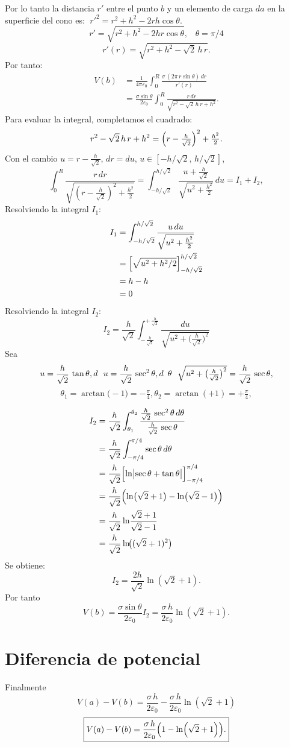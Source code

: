 \documentclass[12pt]{article}
\begin{document}
Por lo tanto la distancia \(r'\) entre el punto \(b\) y un elemento de carga \(da\) en la superficie del cono es:
\(\;r'^2 = r^2 + h^2 - 2rh\cos\theta.\)
\[
  r'=\sqrt{r^2 + h^2 - 2hr\cos\theta} , \,\,\,\,\,\theta = \pi/4
\]
\[
r'(r)=\sqrt{r^2 + h^2 - \sqrt2\,h\,r }.
\]
Por tanto:
\begin{align*}
V(b)
&=\frac{1}{4\pi\varepsilon_0}\int_{0}^{R}\frac{\sigma\,(2\pi\,r\sin\theta)\,dr}{r'(r)}\\
&=\frac{\sigma\sin\theta}{2\varepsilon_0}\int_{0}^{R}\frac{r\,dr}{\sqrt{r^2 - \sqrt2\,h\,r + h^2}}.
\end{align*}
Para evaluar la integral, completamos el cuadrado:
\[
  r^2 - \sqrt2\,h\,r + h^2
  =\Bigl(r-\tfrac{h}{\sqrt2}\Bigr)^2 + \tfrac{h^2}{2}.
\]
Con el cambio $u=r-\tfrac{h}{\sqrt2}$, $dr=du$, $u\in[-h/\sqrt2,\,h/\sqrt2]$,
\[
\int_{0}^{R}\frac{r\,dr}{\sqrt{(r-\tfrac{h}{\sqrt2})^2+\tfrac{h^2}{2}}}
=\int_{-h/\sqrt2}^{h/\sqrt2}\frac{u+\tfrac{h}{\sqrt2}}{\sqrt{u^2+\tfrac{h^2}{2}}}\,du
=I_1+I_2,
\]
Resolviendo la integral \(I_1\):
\begin{align*}
  I_1&=\int_{-h/\sqrt2}^{h/\sqrt2}\frac{u\,du}{\sqrt{u^2+\tfrac{h^2}{2}}}\\ 
     & =\Bigl[ \sqrt{u^2+h^2/2}\Bigr]_{-h/\sqrt2}^{h/\sqrt2}\\
     & =h-h\\
     & = 0
\end{align*}
Resolviendo la integral \(I_2\):
\[
I_2 = \frac{h}{\sqrt2}
\int_{-\,\frac{h}{\sqrt2}}^{+\,\frac{h}{\sqrt2}}
\frac{du}{\sqrt{u^2 + \bigl(\tfrac{h}{\sqrt2}\bigr)^2}}
\]
Sea 
\[
u = \frac{h}{\sqrt2}\,\tan\theta,d\,\,\,\,u = \frac{h}{\sqrt2}\,\sec^2\theta,d\,\,\,\theta\,\,\,\, \sqrt{u^2 + \bigl(\tfrac{h}{\sqrt2}\bigr)^2} = \frac{h}{\sqrt2}\,\sec\theta,\\[6pt]
\]
\[
\theta_1 = \arctan\!\bigl(-1\bigr) = -\tfrac\pi4,
\theta_2 = \arctan\!(+1) = +\tfrac\pi4,
\]

\begin{align*}
I_2
&= \frac{h}{\sqrt2}
    \int_{\theta_1}^{\theta_2}
      \frac{\frac{h}{\sqrt2}\,\sec^2\theta\,d\theta}
           {\frac{h}{\sqrt2}\,\sec\theta}
\\
&= \frac{h}{\sqrt2}
    \int_{-\pi/4}^{\pi/4}
      \sec\theta\,d\theta
\\
&= \frac{h}{\sqrt2}
    \Bigl[\ln\bigl|\sec\theta + \tan\theta\bigr|\Bigr]_{-\pi/4}^{\pi/4}
\\
&= \frac{h}{\sqrt2}\Bigl(
      \ln\bigl(\sqrt2+1\bigr)
    - \ln\bigl(\sqrt2-1\bigr)
    \Bigr)
\\
&= \frac{h}{\sqrt2}\ln\!\frac{\sqrt2+1}{\sqrt2-1}
\\
&= \frac{h}{\sqrt2}\ln\!\bigl((\sqrt2+1)^2\bigr)
\end{align*}
Se obtiene:
\[
I_2 = \frac{2h}{\sqrt2}\ln(\sqrt2+1).
\]
Por tanto
\[
V(b)
=\frac{\sigma\sin\theta}{2\varepsilon_0}I_2
=\frac{\sigma\,h}{2\varepsilon_0}\ln(\sqrt2+1).
\]

\section*{Diferencia de potencial}
Finalmente
\[
V(a)-V(b)
=\frac{\sigma\,h}{2\varepsilon_0}
-\frac{\sigma\,h}{2\varepsilon_0}\ln(\sqrt2+1)
\]
\[
\boxed{V(a)-V(b)=\frac{\sigma\,h}{2\varepsilon_0}\Bigl(1-\ln(\sqrt2+1)\Bigr).}
\]
\end{document}
